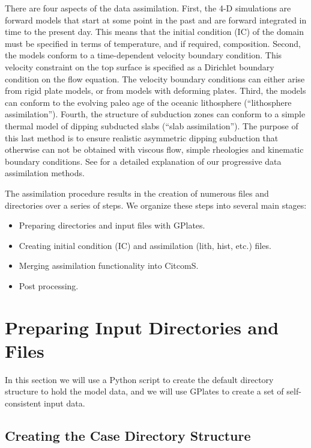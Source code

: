\documentclass[letterpaper,12pt]{article}
\begin{document}
There are four aspects of the data assimilation.  
First, the 4-D simulations are forward models that start at some point in the past and are forward integrated in time to the present day.  
This means that the initial condition (IC) of the domain must be specified in terms of temperature, and if required, composition.  
Second, the models conform to a time-dependent velocity boundary condition.  
This velocity constraint on the top surface is specified as a Dirichlet boundary condition on the flow equation.  
The velocity boundary conditions can either arise from rigid plate models, or from models with deforming plates.  
Third, the models can conform to the evolving paleo age of the oceanic lithosphere (``lithosphere assimilation'').  
Fourth, the structure of subduction zones can conform to a simple thermal model of dipping subducted slabs (``slab assimilation'').  
The purpose of this last method is to ensure realistic asymmetric dipping subduction 
that otherwise can not be obtained with viscous flow, simple rheologies and kinematic boundary conditions.  
See \cite{BGF15} for a detailed explanation of our progressive data assimilation methods.

The assimilation procedure results in the creation of numerous files and directories over a series of steps.  We organize these steps into several main stages: 

\begin{itemize}
\item Preparing directories and input files with GPlates.
\item Creating initial condition (IC) and assimilation (lith, hist, etc.) files.
\item Merging assimilation functionality into CitcomS.
\item Post processing.
\end{itemize}


\section{Preparing Input Directories and Files}

\label{sect:GPlates}

In this section we will use a Python script to create the default directory structure to hold the model data,
and we will use GPlates to create a set of self-consistent input data.

\subsection{Creating the Case Directory Structure}
\end{document}
